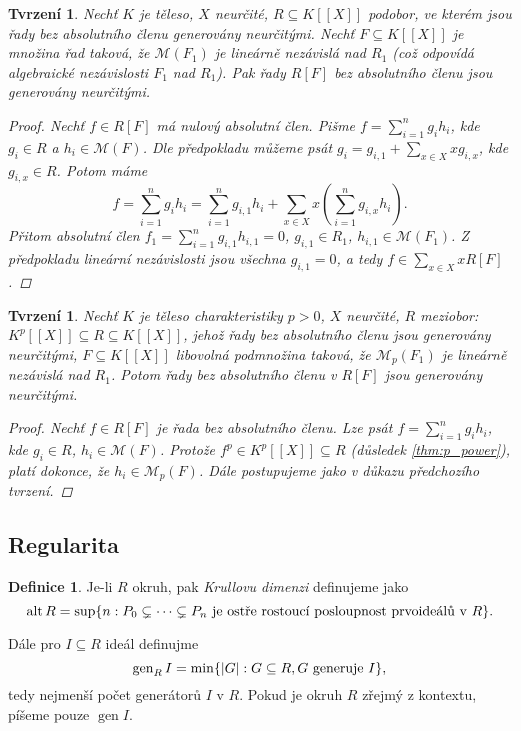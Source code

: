 \documentclass[11pt,a4paper]{article}
\newcommand\p[1]{\mathcal{ #1 }} %
\newcommand*{\ml}[1]{\[\textstyle\let\displaystyle\textstyle#1\]}	%
\newcommand*{\mld}[1]{\[#1\]} %
\DeclareMathOperator{\alt}{alt} %
\DeclareMathOperator{\gen}{gen} %
\newcounter{numb}
\theoremstyle{definition}
\newtheorem*{definice}{Definice}
\theoremstyle{plain}
\newtheorem{tvrzeni}[numb]{Tvrzení}
\begin{document}
\begin{tvrzeni}
	Nechť $K$ je těleso, $X$ neurčité, $R \subseteq K[[X]]$ podobor, ve kterém jsou řady bez absolutního členu generovány neurčitými. Nechť $F \subseteq K[[X]]$ je množina řad taková, že $\p M(F_1)$ je lineárně nezávislá nad $R_1$ (což odpovídá algebraické nezávislosti $F_1$ nad $R_1$). Pak řady $R[F]$ bez absolutního členu jsou generovány neurčitými.
	
	\begin{proof}
		\newcommand*{\I}{_{i = 1}^n}
		
		Nechť $f \in R[F]$ má nulový absolutní člen. Pišme $f = \sum\I g_i h_i$, kde $g_i \in R$ a $h_i \in \p M(F)$. Dle předpokladu můžeme psát $g_i = g_{i, 1} + \sum_{x \in X} x g_{i, x}$, kde $g_{i, x} \in R$. Potom máme
		\mld{
			f = \sum\I g_i h_i = \sum\I g_{i, 1} h_i + \sum_{x \in X} x (\sum\I g_{i, x} h_i).
		}
		Přitom absolutní člen $f_1 = \sum\I g_{i, 1} h_{i, 1} = 0$, $g_{i, 1} \in R_1$, $h_{i, 1} \in \p M(F_1)$. Z předpokladu lineární nezávislosti jsou všechna $g_{i, 1} = 0$, a tedy $f \in \sum_{x \in X} x R[F]$. 
	\end{proof}
\end{tvrzeni}

\begin{tvrzeni} \label{thm:RpF_absOK}
	Nechť $K$ je těleso charakteristiky $p > 0$, $X$ neurčité, $R$ meziobor: $K^p[[X]] \subseteq R \subseteq K[[X]]$, jehož řady bez absolutního členu jsou generovány neurčitými, $F \subseteq K[[X]]$ libovolná podmnožina taková, že $\p M_p(F_1)$ je lineárně nezávislá nad $R_1$. Potom řady bez absolutního členu v $R[F]$ jsou generovány neurčitými.
	
	\begin{proof}
		Nechť $f \in R[F]$ je řada bez absolutního členu. Lze psát $f = \sum_{i = 1}^n g_i h_i$, kde $g_i \in R$, $h_i \in \p M(F)$. Protože $f^p \in K^p[[X]] \subseteq R$ (důsledek \ref{thm:p_power}), platí dokonce, že $h_i \in \p M_p(F)$. Dále postupujeme jako v důkazu předchozího tvrzení.
	\end{proof}
\end{tvrzeni}
	

\subsection{Regularita}

\begin{definice}
	Je-li $R$ okruh, pak \emph{Krullovu dimenzi} definujeme jako
	\ml{
		\alt R = \sup\{n: P_0 \subsetneq \cdots \subsetneq P_n \text{ je ostře rostoucí posloupnost prvoideálů v } R\}.
	}

	Dále pro $I \subseteq R$ ideál definujme
	\ml{
		\gen_R I = \min\{|G|: G \subseteq R, G \text{ generuje } I\},
	}
	tedy nejmenší počet generátorů $I$ v $R$. Pokud je okruh $R$ zřejmý z kontextu, píšeme pouze $\gen I$.
\end{definice}
\end{document}
